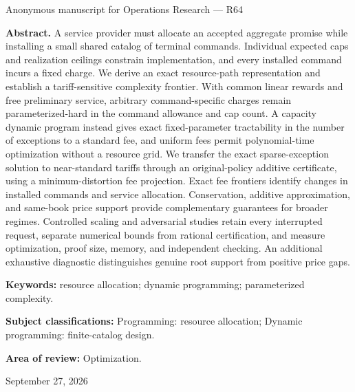 \documentclass[11pt,letterpaper]{article}
\theoremstyle{definition}\newtheorem{remark}[theorem]{Remark}
\begin{document}
\hypersetup{pageanchor=false}
\begin{titlepage}
\vspace{0.25in}Anonymous manuscript for Operations Research --- R64\par\vspace{0.2in}
\begin{minipage}{\textwidth}\textbf{Abstract.} A service provider must allocate an accepted aggregate promise while installing a small shared catalog of terminal commands. Individual expected caps and realization ceilings constrain implementation, and every installed command incurs a fixed charge. We derive an exact resource-path representation and establish a tariff-sensitive complexity frontier. With common linear rewards and free preliminary service, arbitrary command-specific charges remain parameterized-hard in the command allowance and cap count. A capacity dynamic program instead gives exact fixed-parameter tractability in the number of exceptions to a standard fee, and uniform fees permit polynomial-time optimization without a resource grid. We transfer the exact sparse-exception solution to near-standard tariffs through an original-policy additive certificate, using a minimum-distortion fee projection. Exact fee frontiers identify changes in installed commands and service allocation. Conservation, additive approximation, and same-book price support provide complementary guarantees for broader regimes. Controlled scaling and adversarial studies retain every interrupted request, separate numerical bounds from rational certification, and measure optimization, proof size, memory, and independent checking. An additional exhaustive diagnostic distinguishes genuine root support from positive price gaps.
\par\vspace{0.15in}\textbf{Keywords:} resource allocation; dynamic programming; parameterized complexity.
\par\vspace{0.1in}\textbf{Subject classifications:} Programming: resource allocation; Dynamic programming: finite-catalog design.
\par\vspace{0.1in}\textbf{Area of review:} Optimization.\end{minipage}\vfill September 27, 2026\end{titlepage}
\hypersetup{pageanchor=true}
\end{document}
